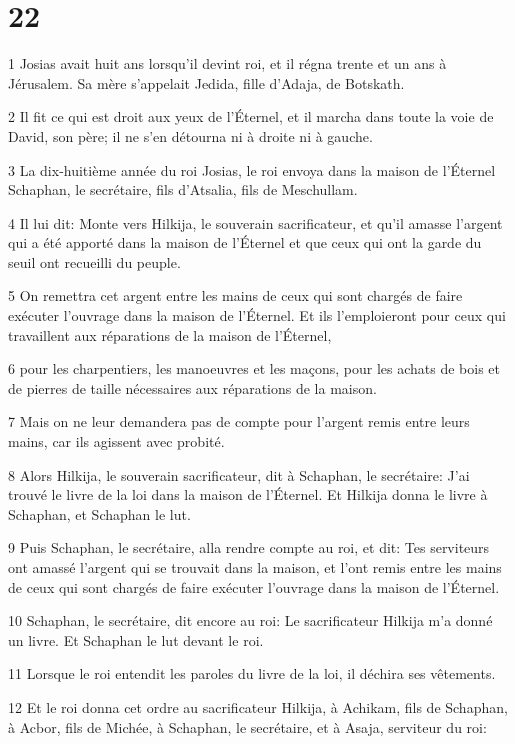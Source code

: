 \chapter{22}

\par 1 Josias avait huit ans lorsqu'il devint roi, et il régna trente et un ans à Jérusalem. Sa mère s'appelait Jedida, fille d'Adaja, de Botskath.
\par 2 Il fit ce qui est droit aux yeux de l'Éternel, et il marcha dans toute la voie de David, son père; il ne s'en détourna ni à droite ni à gauche.
\par 3 La dix-huitième année du roi Josias, le roi envoya dans la maison de l'Éternel Schaphan, le secrétaire, fils d'Atsalia, fils de Meschullam.
\par 4 Il lui dit: Monte vers Hilkija, le souverain sacrificateur, et qu'il amasse l'argent qui a été apporté dans la maison de l'Éternel et que ceux qui ont la garde du seuil ont recueilli du peuple.
\par 5 On remettra cet argent entre les mains de ceux qui sont chargés de faire exécuter l'ouvrage dans la maison de l'Éternel. Et ils l'emploieront pour ceux qui travaillent aux réparations de la maison de l'Éternel,
\par 6 pour les charpentiers, les manoeuvres et les maçons, pour les achats de bois et de pierres de taille nécessaires aux réparations de la maison.
\par 7 Mais on ne leur demandera pas de compte pour l'argent remis entre leurs mains, car ils agissent avec probité.
\par 8 Alors Hilkija, le souverain sacrificateur, dit à Schaphan, le secrétaire: J'ai trouvé le livre de la loi dans la maison de l'Éternel. Et Hilkija donna le livre à Schaphan, et Schaphan le lut.
\par 9 Puis Schaphan, le secrétaire, alla rendre compte au roi, et dit: Tes serviteurs ont amassé l'argent qui se trouvait dans la maison, et l'ont remis entre les mains de ceux qui sont chargés de faire exécuter l'ouvrage dans la maison de l'Éternel.
\par 10 Schaphan, le secrétaire, dit encore au roi: Le sacrificateur Hilkija m'a donné un livre. Et Schaphan le lut devant le roi.
\par 11 Lorsque le roi entendit les paroles du livre de la loi, il déchira ses vêtements.
\par 12 Et le roi donna cet ordre au sacrificateur Hilkija, à Achikam, fils de Schaphan, à Acbor, fils de Michée, à Schaphan, le secrétaire, et à Asaja, serviteur du roi:
